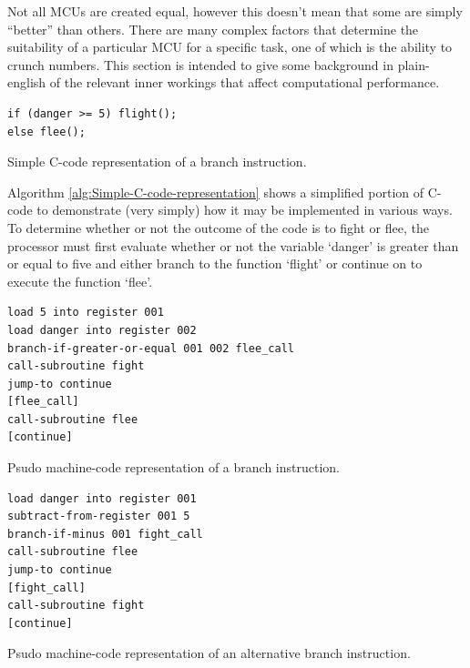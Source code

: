 Not all MCUs are created equal, however this doesn't mean that some
are simply ``better'' than others. There are many complex factors
that determine the suitability of a particular MCU for a specific
task, one of which is the ability to crunch numbers. This section
is intended to give some background in plain-english of the relevant
inner workings that affect computational performance.

\begin{algorithm}[H]
\begin{lstlisting}
if (danger >= 5) flight();
else flee();
\end{lstlisting}
\protect\caption{\label{alg:Simple-C-code-representation}Simple C-code representation
of a branch instruction.}
\end{algorithm}


Algorithm \ref{alg:Simple-C-code-representation} shows a simplified
portion of C-code to demonstrate (very simply) how it may be implemented
in various ways. To determine whether or not the outcome of the code
is to fight or flee, the processor must first evaluate whether or
not the variable `danger' is greater than or equal to five and either
branch to the function `flight' or continue on to execute the function
`flee'.

\begin{algorithm}
\begin{lstlisting}
load 5 into register 001
load danger into register 002
branch-if-greater-or-equal 001 002 flee_call
call-subroutine fight
jump-to continue
[flee_call]
call-subroutine flee
[continue]
\end{lstlisting}
\protect\caption{\label{alg:Psudo-machine-code1}Psudo machine-code representation
of a branch instruction.}
\end{algorithm}





\begin{algorithm}
\begin{lstlisting}
load danger into register 001
subtract-from-register 001 5
branch-if-minus 001 fight_call
call-subroutine flee
jump-to continue
[fight_call]
call-subroutine fight
[continue]
\end{lstlisting}
\caption{\label{alg:Psudo-machine-code2}Psudo machine-code representation
of an alternative branch instruction.}
\end{algorithm}


